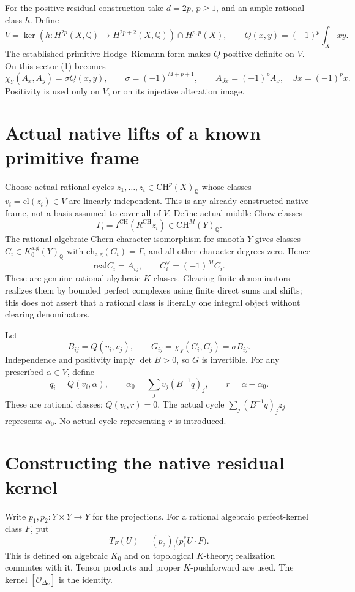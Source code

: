\documentclass[11pt]{article}
\newcommand{\Q}{\mathbb Q}
\newcommand{\CH}{\mathrm{CH}}
\newcommand{\cl}{\mathrm{cl}}
\newcommand{\ch}{\mathrm{ch}}
\newcommand{\real}{\mathrm{real}}
\begin{document}
For the positive residual construction take $d=2p$, $p\ge1$, and
an ample rational class $h$. Define
\[
 V=\ker(h:H^{2p}(X,\Q)\to H^{2p+2}(X,\Q))
       \cap H^{p,p}(X),\qquad
 Q(x,y)=(-1)^p\int_Xxy .
\]
The established primitive Hodge--Riemann form makes $Q$ positive
definite on $V$. On this sector (1) becomes
\[
 \chi_Y(A_x,A_y)=\sigma Q(x,y),\qquad
 \sigma=(-1)^{M+p+1},\qquad A_{Jx}=(-1)^p A_x,
 \quad Jx=(-1)^p x.                                \tag{2}
\]
Positivity is used only on $V$, or on its injective alteration image.

\section{Actual native lifts of a known primitive frame}
Choose actual rational cycles $z_1,\ldots,z_t\in\CH^p(X)_\Q$
whose classes $v_i=\cl(z_i)\in V$ are linearly independent.
This is any already constructed native frame, not a basis assumed
to cover all of $V$. Define actual middle Chow classes
\[
 \Gamma_i=I^{\CH}(R^{\CH}z_i)\in\CH^M(Y)_\Q .
\]
The rational algebraic Chern-character isomorphism for smooth $Y$
gives classes $C_i\in K_0^{\mathrm{alg}}(Y)_\Q$ with
$\ch_{\mathrm{alg}}(C_i)=\Gamma_i$ and all other character degrees zero.
Hence
\[
 \real C_i=A_{v_i},\qquad C_i^\vee=(-1)^M C_i.
\]
These are genuine rational algebraic $K$-classes. Clearing finite
denominators realizes them by bounded perfect complexes using finite
direct sums and shifts; this does not assert that a rational class
is literally one integral object without clearing denominators.

Let
\[
 B_{ij}=Q(v_i,v_j),\qquad
 G_{ij}=\chi_Y(C_i,C_j)=\sigma B_{ij}.                \tag{3}
\]
Independence and positivity imply $\det B>0$, so $G$ is invertible.
For any prescribed $\alpha\in V$, define
\[
 q_i=Q(v_i,\alpha),\qquad
 \alpha_0=\sum_jv_j(B^{-1}q)_j,\qquad
 r=\alpha-\alpha_0.                                 \tag{4}
\]
These are rational classes; $Q(v_i,r)=0$.
The actual cycle $\sum_j(B^{-1}q)_jz_j$ represents $\alpha_0$.
No actual cycle representing $r$ is introduced.

\section{Constructing the native residual kernel}
Write $p_1,p_2:Y\times Y\to Y$ for the projections.
For a rational algebraic perfect-kernel class $F$, put
\[
 T_F(U)=(p_2)_!\bigl(p_1^*U\cdot F\bigr).
\]
This is defined on algebraic $K_0$ and on topological $K$-theory;
realization commutes with it. Tensor products and proper $K$-pushforward
are used. The kernel $[\mathcal O_{\Delta_Y}]$ is the identity.
\end{document}
